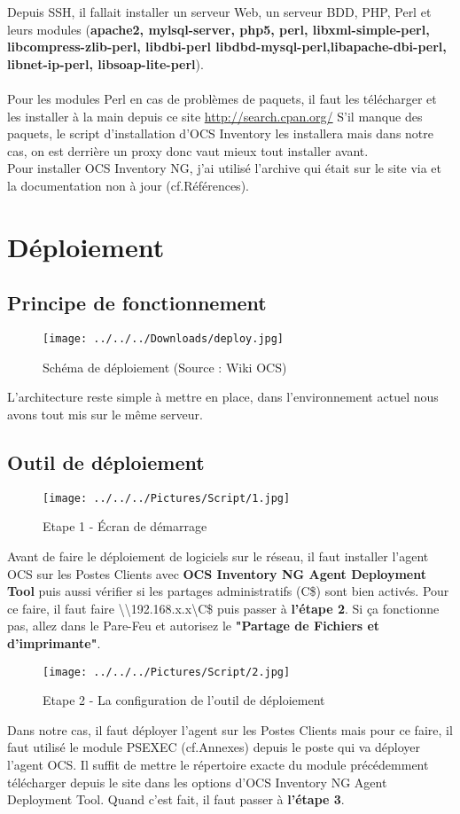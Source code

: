 \documentclass[11pt,a4paper,oneside]{article}
\begin{document}
Depuis SSH, il fallait installer un serveur Web, un serveur BDD, PHP, Perl et leurs modules (\textbf{apache2, mylsql-server, php5, perl, libxml-simple-perl, libcompress-zlib-perl, libdbi-perl libdbd-mysql-perl,libapache-dbi-perl, libnet-ip-perl, libsoap-lite-perl}).\\ \\
Pour les modules Perl en cas de problèmes de paquets, il faut les télécharger et les installer à la main depuis ce site \url{http://search.cpan.org/} 
S'il manque des paquets, le script d'installation d'OCS Inventory les installera mais dans notre cas, on est derrière un proxy donc vaut mieux tout installer avant. \\

Pour installer OCS Inventory NG, j'ai utilisé l'archive qui était sur le site via  et la documentation non à jour (cf.Références).
\newpage
\section{Déploiement}
\subsection{Principe de fonctionnement}
\begin{figure}[hbtp]
\texttt{[image: ../../../Downloads/deploy.jpg]}
\caption{Schéma de déploiement (Source : Wiki OCS)}
\end{figure}
L'architecture reste simple à mettre en place, dans l'environnement actuel nous avons tout mis sur le même serveur.
\subsection{Outil de déploiement}
\begin{figure}[hbtp]
\centering
\texttt{[image: ../../../Pictures/Script/1.jpg]}
\caption{Etape 1 - Écran de démarrage}
\end{figure}
Avant de faire le déploiement de logiciels sur le réseau, il faut installer l'agent OCS sur les Postes Clients avec \textbf{OCS Inventory NG Agent Deployment Tool} puis aussi vérifier si les partages administratifs (C\$) sont bien activés. Pour ce faire, il faut faire \textbackslash\textbackslash 192.168.x.x\textbackslash C\$
 puis passer à \textbf{l'étape 2}. Si ça fonctionne pas, allez dans le Pare-Feu et autorisez le \textbf{"Partage de Fichiers et d'imprimante"}.
\newpage

\begin{figure}[hbtp]
  \centering
  \texttt{[image: ../../../Pictures/Script/2.jpg]}
  \caption{Etape 2 - La configuration de l'outil de déploiement}
\end{figure} 
Dans notre cas, il faut déployer l'agent sur les Postes Clients mais pour ce faire, il faut utilisé le module PSEXEC (cf.Annexes) depuis le poste qui va déployer l'agent OCS. Il suffit de mettre le répertoire exacte du module précédemment télécharger depuis le site dans les options d'OCS Inventory NG Agent Deployment Tool. Quand c'est fait, il faut passer à \textbf{l'étape 3}. \\
\end{document}
